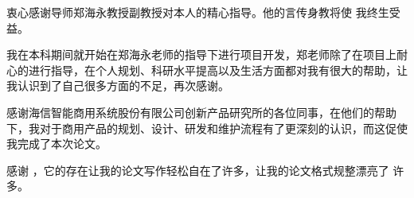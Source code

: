 \begin{acknowledgement}
  衷心感谢导师郑海永教授副教授对本人的精心指导。他的言传身教将使
  我终生受益。

  我在本科期间就开始在郑海永老师的指导下进行项目开发，郑老师除了在项目上耐心的进行指导，在个人规划、科研水平提高以及生活方面都对我有很大的帮助，让我认识到了自己很多方面的不足，再次感谢。

  感谢海信智能商用系统股份有限公司创新产品研究所的各位同事，在他们的帮助下，我对于商用产品的规划、设计、研发和维护流程有了更深刻的认识，而这促使我完成了本次论文。

  感谢 \thuthesis，它的存在让我的论文写作轻松自在了许多，让我的论文格式规整漂亮了
  许多。
\end{acknowledgement}
